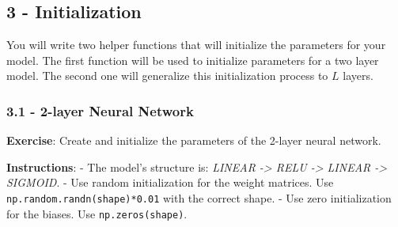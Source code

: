 \documentclass[11pt]{article}
\begin{document}
    \subsection{3 - Initialization}\label{initialization}

You will write two helper functions that will initialize the parameters
for your model. The first function will be used to initialize parameters
for a two layer model. The second one will generalize this
initialization process to \(L\) layers.

\subsubsection{3.1 - 2-layer Neural Network}\label{layer-neural-network}

\textbf{Exercise}: Create and initialize the parameters of the 2-layer
neural network.

\textbf{Instructions}: - The model's structure is: \emph{LINEAR
-\textgreater{} RELU -\textgreater{} LINEAR -\textgreater{} SIGMOID}. -
Use random initialization for the weight matrices. Use
\texttt{np.random.randn(shape)*0.01} with the correct shape. - Use zero
initialization for the biases. Use \texttt{np.zeros(shape)}.
\end{document}
